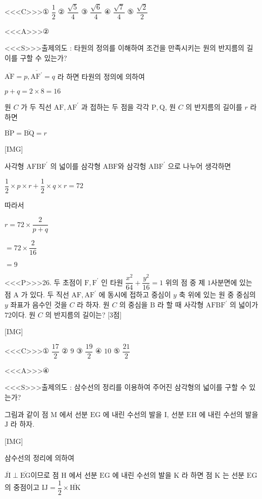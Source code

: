 \documentclass{oblivoir}
\begin{document}
<<<C>>>① $\dfrac{1}{2}$
② $\dfrac{\sqrt{5}}{4}$
③ $\dfrac{\sqrt{6}}{4}$
④ $\dfrac{\sqrt{7}}{4}$
⑤ $\dfrac{\sqrt{2}}{2}$


<<<A>>>②

<<<S>>>출제의도 : 타원의 정의를 이해하여 조건을 만족시키는 원의 반지름의 길이를 구할 수 있는가?

$\overline{\mathrm{AF}}=p, \overline{\mathrm{AF}^{\prime}}=q$ 라 하면 타원의 정의에
의하여

$p+q=2 \times 8=16$

원 $C$ 가 두 직선 $\mathrm{AF}, \mathrm{AF}^{\prime}$ 과 접하는 두 점을 각각 $\mathrm{P}, \mathrm{Q}$, 원 $C$ 의 반지름의 길이를 $r$ 라 하면

$\overline{\mathrm{BP}}=\overline{\mathrm{BQ}}=r$

[IMG]

사각형 $\mathrm{AFBF}^{\prime}$ 의 넓이를 삼각형 $\mathrm{ABF}$와 삼각헝 $\mathrm{ABF}^{\prime}$ 으로 나누어 생각하면

$\dfrac{1}{2} \times p \times r+\dfrac{1}{2} \times q \times r=72$

따라서

$r=72 \times \dfrac{2}{p+q}$

$=72 \times \dfrac{2}{16}$

$=9$


<<<P>>>26. 두 초점이 $\mathrm{F}, \mathrm{F}^{\prime}$ 인 타원 $\dfrac{x^{2}}{64}+\dfrac{y^{2}}{16}=1$ 위의 점 중 제 $1$사분면에 있는 점 $\mathrm{A}$ 가 있다. 두 직선 $\mathrm{AF}, \mathrm{AF}^{\prime}$ 에 동시에 접하고 중심이 $y$ 축 위에 있는 원 중 중심의 $y$ 좌표가 음수인 것을 $C$ 라 하자. 원 $C$ 의 중심을 $\mathrm{B}$ 라 할 때 사각형 $\mathrm{AFBF}^{\prime}$ 의 넓이가 $72$이다. 원 $C$ 의 반지름의 길이는? [3점]

[IMG]

<<<C>>>① $\dfrac{17}{2}$
② $9$
③ $\dfrac{19}{2}$
④ $10$
⑤ $\dfrac{21}{2}$


<<<A>>>④

<<<S>>>출제의도 : 삼수선의 정리를 이용하여 주어진 삼각형의 넓이를 구할 수 있는가?

그림과 같이 점 $\mathrm{M}$ 에서 선분 $\mathrm{EG}$ 에 내린 수선의 발을 $\mathrm{I}$, 선분 $\mathrm{EH}$ 에 내린 수선의 발을 $\mathrm{J}$ 라 하자.

[IMG]

삼수선의 정리에 의하여

$\overline{\mathrm{JI}} \perp \overline{\mathrm{EG}}$이므로 점 $\mathrm{H}$ 에서 선분 $\mathrm{EG}$ 에 내린 수선의 발을 $\mathrm{K}$ 라 하면 점 $\mathrm{K}$ 는 선분 $\mathrm{EG}$ 의 중점이고
$\mathrm{IJ} =\dfrac{1}{2} \times \overline{\mathrm{HK}}$
\end{document}
